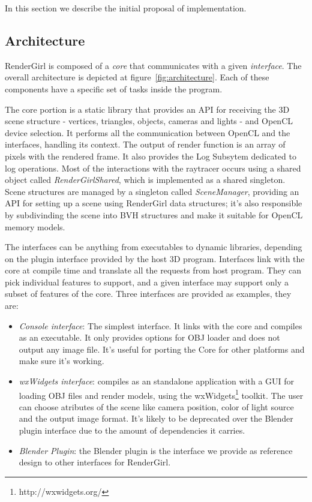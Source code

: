 \documentclass[a4paper]{sbgames}               %
\begin{document}
In this section we describe the initial proposal of implementation.

\subsection{Architecture}

RenderGirl is composed of a \emph{core} that communicates with a given
\emph{interface}. The overall architecture is depicted at figure~\ref{fig:architecture}. Each of these components have a specific set
of tasks inside the program.

The core portion is a static library that provides an API for
receiving the 3D scene structure - vertices, triangles, objects,
cameras and lights - and OpenCL device selection. It performs all the
communication between OpenCL and the interfaces, handling its
context. The output of render function is an array of pixels with the
rendered frame. It also provides the Log Subsytem dedicated to log
operations. Most of the interactions with the raytracer occurs using a
shared object called \emph{RenderGirlShared}, which is implemented as
a shared singleton. Scene structures are managed by a singleton called
\emph{SceneManager}, providing an API for setting up a scene using
RenderGirl data structures; it's also responsible by subdivinding the
scene into BVH structures and make it suitable for OpenCL memory
models.


The interfaces can be anything from executables to dynamic libraries,
depending on the plugin interface provided by the host 3D
program. Interfaces link with the core at compile time and translate
all the requests from host program. They can pick individual features
to support, and a given interface may support only a subset of
features of the core. Three interfaces are provided as examples, they
are:

\begin{itemize}
\item \emph{Console interface}: The simplest interface. It links with
  the core and compiles as an executable. It only provides options for
  OBJ loader and does not output any image file. It's useful for
  porting the Core for other platforms and make sure it's working.
\item \emph{wxWidgets interface}: compiles as an standalone
  application with a GUI for loading OBJ files and render models,
  using the wxWidgets\footnote{http://wxwidgets.org/} toolkit. The
  user can choose atributes of the scene like camera position, color
  of light source and the output image format. It's likely to be
  deprecated over the Blender plugin interface due to the amount of
  dependencies it carries.
\item \emph{Blender Plugin}: the Blender plugin is the interface we
  provide as reference design to other interfaces for RenderGirl.
\end{itemize}
\end{document}
